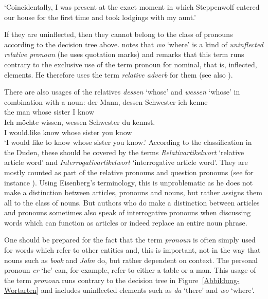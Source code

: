 \glt `Coincidentally, I was present at the exact moment in which Steppenwolf entered our house for the first time and took lodgings with my aunt.'
\zl


If they are uninflected, then they cannot belong to the class of pronouns according to the decision tree above.
\citet[]{Eisenberg2004a} notes that \emph{wo} `where' is a kind of \emph{uninflected relative
pronoun} (he uses quotation marks) and remarks that this term runs contrary to the exclusive use of the
term pronoun for nominal, that is, inflected, elements. He therefore uses the
term \emph{relative adverb} for them (see also ).

There are also usages of the relatives \emph{dessen} `whose' and \emph{wessen} `whose' in combination with a noun:
\eal
\ex 
\gll der Mann, dessen Schwester ich kenne\\
	 the man whose sister I know\\
\ex 
\gll Ich möchte wissen, wessen Schwester du kennst.\\
	 I would.like know whose sister you know\\
\glt `I would like to know whose sister you know.'
\zl
According to the classification in the Duden, these should be covered by the terms \emph{Relativartikelwort} `relative article word' and
\emph{Interrogativartikelwort} `interrogative article word'. They are mostly counted as part of the relative pronouns and question pronouns
(see for instance ). Using Eisenberg's terminology, this is unproblematic as he does not make a distinction between articles,
pronouns and nouns, but rather assigns them all to the class of nouns. But authors who do make a distinction between articles and pronouns sometimes
also speak of interrogative pronouns when discussing words which can function as articles or indeed replace an entire noun phrase.


One should be prepared for the fact that the term \emph{pronoun} is often simply used for words which refer to other
entities and, this is important, not in the way that nouns such as \emph{book} and \emph{John} do, but rather dependent on context.
The personal pronoun \emph{er} `he' can, for example, refer to either a table or a man. This usage of the term \emph{pronoun}
runs contrary to the decision tree in Figure~\ref{Abbildung-Wortarten} and includes uninflected elements such as \emph{da} `there' and 
\emph{wo} `where'.

